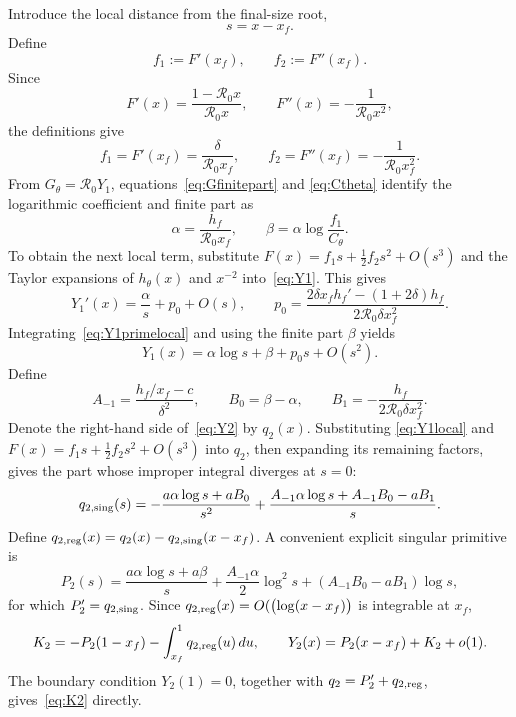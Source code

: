 \documentclass[11pt,a4paper]{article}
\newcommand{\Rzero}{\mathcal R_0}
\newcommand{\xf}{x_f}
\begin{document}
Introduce the local distance from the final-size root,
\[
s=x-\xf.
\]
Define
\[
f_1:=F'(\xf),
\qquad
f_2:=F''(\xf).
\]
Since
\[
F'(x)=\frac{1-\Rzero x}{\Rzero x},
\qquad
F''(x)=-\frac{1}{\Rzero x^2},
\]
the definitions give
\[
f_1=F'(\xf)=\frac{\delta}{\Rzero\xf},
\qquad
f_2=F''(\xf)=-\frac{1}{\Rzero\xf^2}.
\]
From $G_\theta=\Rzero Y_1$, equations~\eqref{eq:Gfinitepart} and
\eqref{eq:Ctheta} identify the logarithmic coefficient and finite part as
\[
\alpha=\frac{h_f}{\Rzero\xf},
\qquad
\beta=\alpha\log\frac{f_1}{C_\theta}.
\]
To obtain the next local term, substitute
$F(x)=f_1s+\tfrac12f_2s^2+O(s^3)$ and the Taylor expansions of
$h_\theta(x)$ and $x^{-2}$ into~\eqref{eq:Y1}. This gives
\begin{equation}
Y_1'(x)=\frac{\alpha}{s}+p_0+O(s),
\qquad
p_0=\frac{2\delta\xf h_f'-(1+2\delta)h_f}
{2\Rzero\delta\xf^2}.
\label{eq:Y1primelocal}
\end{equation}
Integrating~\eqref{eq:Y1primelocal} and using the finite part $\beta$ yields
\begin{equation}
Y_1(x)=\alpha\log s+\beta+p_0s+O(s^2).
\label{eq:Y1local}
\end{equation}
Define
\[
A_{-1}=\frac{h_f/\xf-c}{\delta^2},
\qquad B_0=\beta-\alpha,
\qquad B_1=-\frac{h_f}{2\Rzero\delta\xf^2}.
\]
Denote the right-hand side of~\eqref{eq:Y2} by $q_2(x)$. Substituting
\eqref{eq:Y1local} and
$F(x)=f_1s+\tfrac12f_2s^2+O(s^3)$ into $q_2$, then expanding its remaining
factors, gives the part whose improper integral diverges at $s=0$:
\begin{equation}
\label{eq:q2sing}
q_{2,{\rm sing}}(s)
=-\frac{a\alpha\log s+aB_0}{s^2}
+\frac{A_{-1}\alpha\log s+A_{-1}B_0-aB_1}{s}.
\end{equation}
Define
$q_{2,{\rm reg}}(x)=q_2(x)-q_{2,{\rm sing}}(x-\xf)$. A convenient explicit
singular primitive is
\begin{equation}
\label{eq:P2}
P_2(s)=\frac{a\alpha\log s+a\beta}{s}
+\frac{A_{-1}\alpha}{2}\log^2s
+(A_{-1}B_0-aB_1)\log s,
\end{equation}
for which $P_2'=q_{2,{\rm sing}}$. Since
$q_{2,{\rm reg}}(x)=O(\bigl(\log(x-\xf)\bigr)$ is integrable at $\xf$,
\begin{equation}
\label{eq:K2}
K_2=-P_2(1-\xf)-\int_{\xf}^{1}q_{2,{\rm reg}}(u)\,du,
\qquad
Y_2(x)=P_2(x-\xf)+K_2+o(1).
\end{equation}
The boundary condition $Y_2(1)=0$, together with
$q_2=P_2'+q_{2,{\rm reg}}$, gives~\eqref{eq:K2} directly.
\end{document}
